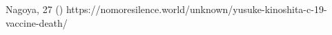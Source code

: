           {Nagoya, }
          {27}
          {}
          {}
          {
             ()
          }
          {https://nomoresilence.world/unknown/yusuke-kinoshita-c-19-vaccine-death/}
